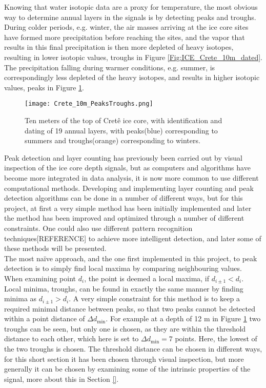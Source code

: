 \documentclass[../../CompleteThesis/Complete_1stDraft.tex]{subfiles}
\begin{document}
	Knowing that water isotopic data are a proxy for temperature, the most obvious way to determine annual layers in the signals is by detecting peaks and troughs. During colder periods, e.g. winter, the air masses arriving at the ice core sites have formed more precipitation before reaching the sites, and the vapor that results in this final precipitation is then more depleted of heavy isotopes, resulting in lower isotopic values, troughs in Figure \ref{Fig:ICE_Crete_10m_dated}. The precipitation falling during warmer conditions, e.g. summer, is correspondingly less depleted of the heavy isotopes, and results in higher isotopic values, peaks in Figure \ref{Fig:COMPMETH_Crete_10m_PeaksTroughs}.
	\begin{figure}[h]
		\centering
		\texttt{[image: Crete\_10m\_PeaksTroughs.png]}
		\caption{Ten meters of the top of Cretê ice core, with identification and dating of 19 annual layers, with peaks(blue) corresponding to summers and troughs(orange) corresponding to winters.}
		\label{Fig:COMPMETH_Crete_10m_PeaksTroughs}
	\end{figure}
	Peak detection and layer counting has previously been carried out by visual inspection of the ice core depth signals, but as computers and algorithms have become more integrated in data analysis, it is now more common to use different computational methods. Developing and implementing layer counting and peak detection algorithms can be done in a number of different ways, but for this project, at first a very simple method has been initially implemented and later the method has been improved and optimized through a number of different constraints. One could also use different pattern recognition techniques[REFERENCE] to achieve more intelligent detection, and later some of these methods will be presented.\\
	The most naïve approach, and the one first implemented in this project, to peak detection is to simply find local maxima by comparing neighbouring values. When examining point $d_i$, the point is deemed a local maxima, if $d_{i\pm1} < d_i$. Local minima, troughs, can be found in exactly the same manner by finding minima as $d_{i\pm1} > d_i$. A very simple constraint for this method is to keep a required minimal distance between peaks, so that two peaks cannot be detected within a point distance of $\Delta d_{\text{min}}$. For example at a depth of 12 m in Figure \ref{Fig:COMPMETH_Crete_10m_PeaksTroughs} two troughs can be seen, but only one is chosen, as they are within the threshold distance to each other, which here is set to $\Delta d_{\text{min}} = 7$ points. Here, the lowest of the two troughs is chosen. The threshold distance can be chosen in different ways, for this short section it has been chosen through visual inspection, but more generally it can be chosen by examining some of the intrinsic properties of the signal, more about this in Section \ref{}.
	
	
	

	
\end{document}
